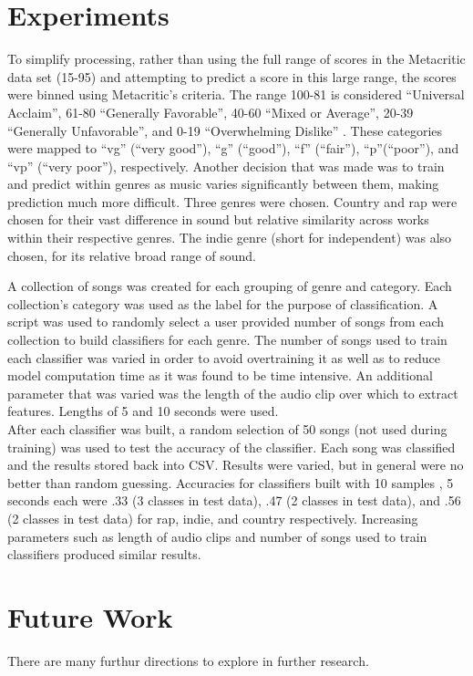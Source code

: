 \documentclass{acm_proc_article-sp}
\begin{document}
\section{Experiments}

To simplify processing, rather than using the full range of scores in the 
Metacritic data set (15-95) and attempting to predict a score in this large
range, the scores were binned using Metacritic's criteria. The range
100-81 is considered ``Universal Acclaim'', 61-80 ``Generally Favorable'', 40-60 ``Mixed or Average'',
20-39 ``Generally Unfavorable'', and 0-19 ``Overwhelming Dislike'' \cite{metacritic}.
These categories were mapped to ``vg'' (``very good''), ``g'' (``good''), ``f'' (``fair''),
``p''(``poor''), and ``vp'' (``very poor''), respectively.
Another decision that was made was to train and predict within genres as music
varies significantly between them, making prediction much more difficult.
Three genres were chosen. Country and rap were chosen for their vast difference in sound
but relative similarity across works within their respective genres. 
The indie genre (short for independent) was also chosen, for its relative broad
range of sound.

A collection of songs was created for each grouping of genre and category.
Each collection's category was used as the label for the purpose of classification.
A script was used to randomly select a user provided number of songs from each 
collection to build classifiers for each genre. The number of songs used to train
each classifier was varied in order to avoid overtraining it as well as to reduce
model computation time as it was found to be time intensive. An additional parameter that was
varied was the length of the audio clip over which to extract features. Lengths of 
5 and 10 seconds were used.\\

After each classifier was built, a random selection of 50 songs (not used during
training) was used to test the accuracy of the classifier. Each song was
classified and the results stored back into CSV. Results were varied, but in general
were no better than random guessing. Accuracies for classifiers built with 10 samples
, 5 seconds each were .33 (3 classes in test data), .47 (2 classes in test data), and
.56 (2 classes in test data) for rap, indie, and country respectively. Increasing
parameters such as length of audio clips and number of songs used to train classifiers
produced similar results.

\section{Future Work}
There are many furthur directions to explore in further research.
\end{document}
